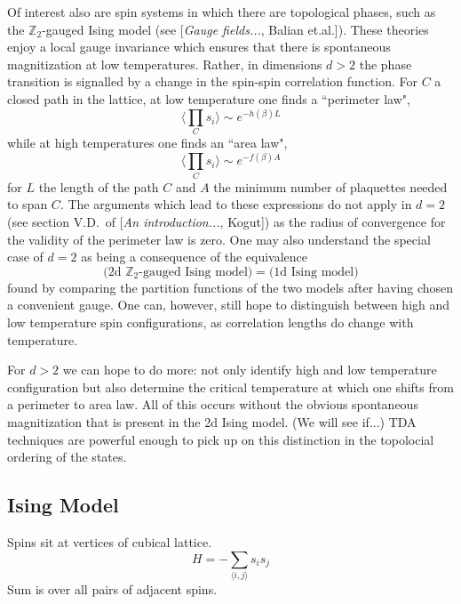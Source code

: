 \documentclass[11pt]{article}
\begin{document}
Of interest also are spin systems in which there are topological phases, such as the $\mathbb{Z}_2$-gauged Ising model (see [\textit{Gauge fields...}, Balian et.al.]). These theories enjoy a local gauge invariance which ensures that there is spontaneous magnitization at low temperatures. Rather, in dimensions $d>2$ the phase transition is signalled by a change in the spin-spin correlation function. For $C$ a closed path in the lattice, at low temperature one finds a ``perimeter law",
\begin{equation}
    \langle\prod_C s_i\rangle \sim e^{-h(\beta)L}
\end{equation}
while at high temperatures one finds an ``area law",
\begin{equation}
    \langle\prod_C s_i\rangle \sim e^{-f(\beta)A}
\end{equation}
for $L$ the length of the path $C$ and $A$ the minimum number of plaquettes needed to span $C$. The arguments which lead to these expressions do not apply in $d=2$ (see section V.D.~of [\textit{An introduction...}, Kogut]) as the radius of convergence for the validity of the perimeter law is zero. One may also understand the special case of $d=2$ as being a consequence of the equivalence
\begin{equation}
    \Big(\text{2d }\mathbb{Z}_2\text{-gauged Ising model}\Big) = \Big( \text{1d Ising model} \Big)
\end{equation}
found by comparing the partition functions of the two models after having chosen a convenient gauge. One can, however, still hope to distinguish between high and low temperature spin configurations, as correlation lengths do change with temperature.

For $d>2$ we can hope to do more: not only identify high and low temperature configuration but also determine the critical temperature at which one shifts from a perimeter to area law. All of this occurs without the obvious spontaneous magnitization that is present in the 2d Ising model. (We will see if...) TDA techniques are powerful enough to pick up on this distinction in the topolocial ordering of the states.

\subsection{Ising Model}
Spins sit at vertices of cubical lattice.
\begin{equation}
    H = -\sum_{\langle i,j\rangle}s_is_j
\end{equation}
Sum is over all pairs of adjacent spins.
\end{document}
